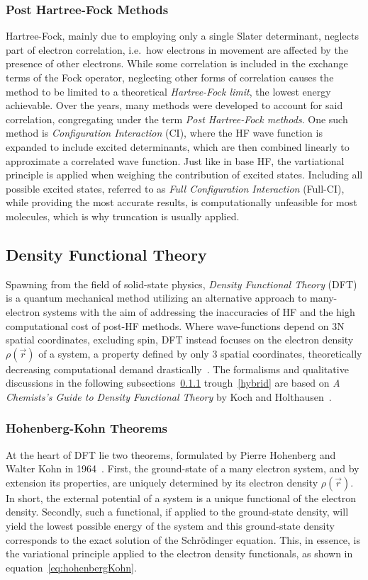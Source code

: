 \documentclass[11pt]{article}
\begin{document}
\subsubsection{Post Hartree-Fock Methods}
Hartree-Fock, mainly due to employing only a single Slater determinant, neglects part of electron correlation, i.e.~how electrons in movement are affected by the presence of other electrons.
While some correlation is included in the exchange terms of the Fock operator, neglecting other forms of correlation causes the method to be limited to a theoretical \textit{Hartree-Fock limit}, the lowest energy achievable.
Over the years, many methods were developed to account for said correlation, congregating under the term \textit{Post Hartree-Fock methods}.
One such method is \textit{Configuration Interaction} (CI), where the HF wave function is expanded to include excited determinants, which are then combined linearly to approximate a correlated wave function. Just like in base HF, the vartiational principle is applied when weighing the contribution of excited states.
Including all possible excited states, referred to as \textit{Full Configuration Interaction} (Full-CI), while providing the most accurate results, is computationally unfeasible for most molecules, which is why truncation is usually applied.

\subsection{Density Functional Theory}
Spawning from the field of solid-state physics, \textit{Density Functional Theory} (DFT) is a quantum mechanical method utilizing an alternative approach to many-electron systems with the aim of addressing the inaccuracies of HF and the high computational cost of post-HF methods.
Where wave-functions depend on 3N spatial coordinates, excluding spin, DFT instead focuses on the electron density $\rho(\vec{r})$ of a system, a property defined by only 3 spatial coordinates, theoretically decreasing computational demand drastically~\cite{Orio2009}.
The formalisms and qualitative discussions in the following subsections~\ref{hohenbergKohn} trough~\ref{hybrid} are based on \textit{A Chemists's Guide to Density Functional Theory} by Koch and Holthausen~\cite{Koch2001-yq}.

\subsubsection{Hohenberg-Kohn Theorems}\label{hohenbergKohn}
At the heart of DFT lie two theorems, formulated by Pierre Hohenberg and Walter Kohn in 1964~\cite{Hohenberg1964}.
First, the ground-state of a many electron system, and by extension its properties, are uniquely determined by its electron density $\rho(\vec{r})$. In short, the external potential of a system is a unique functional of the electron density.
Secondly, such a functional, if applied to the ground-state density, will yield the lowest possible energy of the system and this ground-state density corresponds to the exact solution of the Schrödinger equation. 
This, in essence, is the variational principle applied to the electron density functionals, as shown in equation~\ref{eq:hohenbergKohn}.
\end{document}
